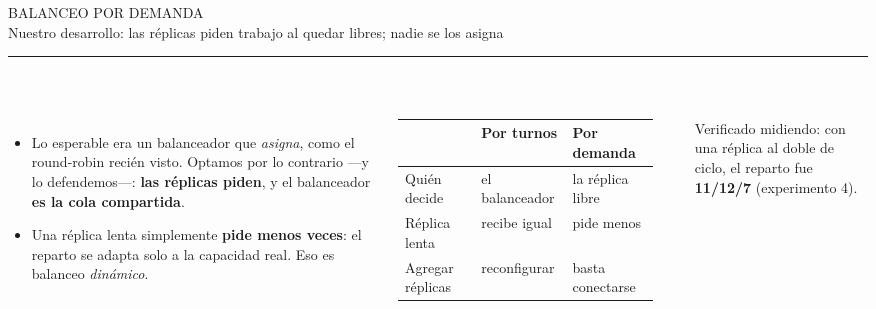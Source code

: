 \documentclass[aspectratio=169,10pt]{beamer}
\newcommand{\titulo}[2]{%
  \vspace{0.12cm}%
  {\dinfont\LARGE\color{marino}\MakeUppercase{#1}}\\[0.3ex]
  {\normalsize\color{grisazul}#2}\\[0.2ex]
  {\color{tealu}\rule{2.2cm}{2pt}}\\[0.6ex]}
\begin{document}
\begin{frame}
\titulo{Balanceo por demanda}{Nuestro desarrollo: las réplicas piden trabajo al quedar libres; nadie se los asigna}
\begin{columns}[T]
\begin{itemize}
  \item Lo esperable era un balanceador que \emph{asigna}, como el round-robin recién visto. Optamos por lo contrario —y lo defendemos—: \textbf{las réplicas piden}, y el balanceador \textbf{es la cola compartida}.
  \item Una réplica lenta simplemente \textbf{pide menos veces}: el reparto se adapta solo a la capacidad real. Eso es balanceo \emph{dinámico}.
\end{itemize}
\vspace{0.1cm}
{\footnotesize\setlength{\tabcolsep}{4pt}
\begin{tabular}{L{2.6cm} L{2.1cm} L{2.1cm}}
\toprule
 & \textbf{Por turnos} & \textbf{Por demanda} \\
\midrule
Quién decide & el balanceador & la réplica libre \\
Réplica lenta & recibe igual & pide menos \\
Agregar réplicas & reconfigurar & basta conectarse \\
\bottomrule
\end{tabular}}
\begin{center}
\end{center}
\vspace{0.1cm}
{\footnotesize\color{grisazul}Verificado midiendo: con una réplica al doble de ciclo, el reparto fue \textbf{11/12/7} (experimento 4).}
\end{columns}
\end{frame}
\end{document}
